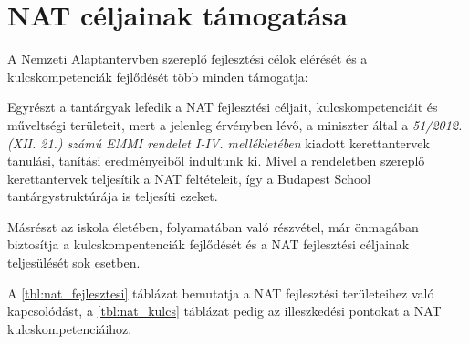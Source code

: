 \section{NAT céljainak támogatása}
\label{sec:nat_celjai}
A Nemzeti Alaptantervben szereplő fejlesztési célok elérését és a
kulcskompetenciák fejlődését több minden támogatja:

Egyrészt a tantárgyak lefedik a NAT fejlesztési céljait, kulcskompetenciáit és
műveltségi területeit, mert a jelenleg érvényben lévő, a miniszter által a
\emph{51/2012. (XII. 21.) számú EMMI rendelet I-IV. mellékletében} kiadott
kerettantervek \citep{ofi:kerettanterv} tanulási, tanítási eredményeiből
indultunk ki. Mivel a rendeletben szereplő kerettantervek teljesítik a NAT
feltételeit, így a Budapest School tantárgystruktúrája is teljesíti ezeket.

Másrészt az iskola életében, folyamatában való részvétel, már önmagában
biztosítja a kulcskompentenciák fejlődését és a NAT fejlesztési céljainak
teljesülését sok esetben.

A \ref{tbl:nat_fejlesztesi} táblázat bemutatja a NAT fejlesztési területeihez
való kapcsolódást, a
\ref{tbl:nat_kulcs} táblázat pedig az illeszkedési pontokat a NAT
kulcskompetenciáihoz.


